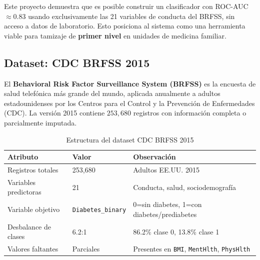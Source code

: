 \documentclass[12pt,a4paper]{article}
\begin{document}
Este proyecto demuestra que es posible construir un clasificador con ROC-AUC $\approx 0.83$ usando exclusivamente las 21 variables de conducta del BRFSS, sin acceso a datos de laboratorio. Esto posiciona al sistema como una herramienta viable para tamizaje de \textbf{primer nivel} en unidades de medicina familiar.

\subsection{Dataset: CDC BRFSS 2015}

El \textbf{Behavioral Risk Factor Surveillance System (BRFSS)} es la encuesta de salud telefónica más grande del mundo, aplicada anualmente a adultos estadounidenses por los Centros para el Control y la Prevención de Enfermedades (CDC). La versión 2015 contiene $253{,}680$ registros con información completa o parcialmente imputada.

\begin{table}[H]
  \centering
  \caption{Estructura del dataset CDC BRFSS 2015}
  \label{tab:dataset}
  \begin{tabular}{lll}
    \toprule
    \textbf{Atributo} & \textbf{Valor} & \textbf{Observación}\\
    \midrule
    Registros totales & 253{,}680 & Adultos EE.UU. 2015\\
    Variables predictoras & 21 & Conducta, salud, sociodemografía\\
    Variable objetivo & \texttt{Diabetes\_binary} & 0=sin diabetes, 1=con diabetes/prediabetes\\
    Desbalance de clases & 6.2:1 & 86.2\% clase 0, 13.8\% clase 1\\
    Valores faltantes & Parciales & Presentes en \texttt{BMI}, \texttt{MentHlth}, \texttt{PhysHlth}\\
    \bottomrule
  \end{tabular}
\end{table}
\end{document}
